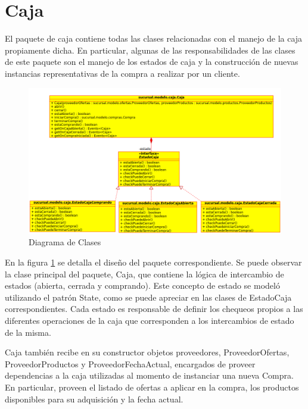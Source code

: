 \documentclass[a4paper,11pt]{article}
\begin{document}
\section{Caja}

El paquete de caja contiene todas las clases relacionadas con el manejo de la
caja propiamente dicha. En particular, algunas de las responsabilidades de las
clases de este paquete son el manejo de los estados de caja y la construcción
de nuevas instancias representativas de la compra a realizar por un cliente.

\begin{figure}[!htp]
\begin{center}
\includegraphics[width=1\textwidth]{src/docs/caja.png}
\end{center}
\caption{Diagrama de Clases} \label{fig:caja}
\end{figure}

\FloatBarrier

En la figura \ref{fig:caja} se detalla el diseño del paquete correspondiente.
Se puede observar la clase principal del paquete, Caja, que contiene la lógica
de intercambio de estados (abierta, cerrada y comprando). Este concepto de
estado se modeló utilizando el patrón State, como se puede apreciar en las
clases de EstadoCaja correspondientes. Cada estado es responsable de definir
los chequeos propios a las diferentes operaciones de la caja que corresponden a
los intercambios de estado de la misma.

Caja también recibe en su constructor objetos proveedores, ProveedorOfertas,
ProveedorProductos y ProveedorFechaActual, encargados de proveer dependencias a
la caja utilizadas al momento de instanciar una nueva Compra. En particular,
proveen el listado de ofertas a aplicar en la compra, los productos disponibles
para su adquisición y la fecha actual.
\end{document}
